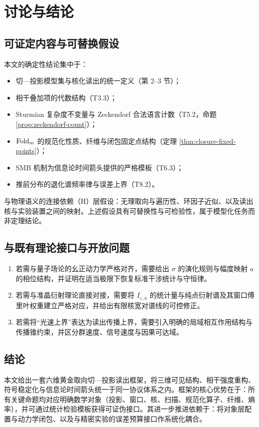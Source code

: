 \section{讨论与结论}

\subsection{可证定内容与可替换假设}

本文的确定性结论集中于：
\begin{itemize}
  \item 切—投影模型集与核化读出的统一定义（第 2--3 节）；
  \item 相干叠加项的代数结构（T3.3）；
  \item Sturmian 复杂度不变量与 Zeckendorf 合法语言计数（T5.2，命题 \ref{prop:zeckendorf-count}）；
  \item $\mathrm{Fold}_m$ 的规范化性质、纤维与闭包固定点结构（定理 \ref{thm:closure-fixed-points}）；
  \item SMB 机制为信息论时间箭头提供的严格模板（T6.3）；
  \item 推前分布的退化谱频率律与误差上界（T8.2）。
\end{itemize}

与物理语义的连接依赖（H）层假设：无理取向与遍历性、环因子近似、以及读出核与实验装置之间的映射。上述假设具有可替换性与可检验性，属于模型化任务而非定理结论。

\subsection{与既有理论接口与开放问题}

\begin{enumerate}
  \item 若需与量子场论的幺正动力学严格对齐，需要给出 $\sigma$ 的演化规则与幅度映射 $a$ 的相位结构，并证明在适当极限下恢复标准干涉统计与守恒律。
  \item 若需与准晶衍射理论直接对接，需要将 $I_{\varepsilon,u}$ 的统计量与纯点衍射谱及其窗口傅里叶权重建立严格对应，并给出有限核宽对谱线的可控修正。
  \item 若需将“光速上界”表达为读出传播上界，需要引入明确的局域相互作用结构与传播锥约束，并区分群速度、信号速度与因果可达域。
\end{enumerate}

\subsection{结论}

本文给出一套六维黄金取向切—投影读出框架，将三维可见结构、相干强度重构、符号稳定化与信息论时间箭头统一于同一协议体系之内。框架的核心优势在于：所有关键命题均对应明确数学对象（投影、窗口、核、扫描、规范化算子、纤维、熵率），并可通过统计检验模板获得可证伪接口。其进一步推进依赖于：将对象层配置与动力学闭包、以及与精密实验的误差预算接口作系统化耦合。

